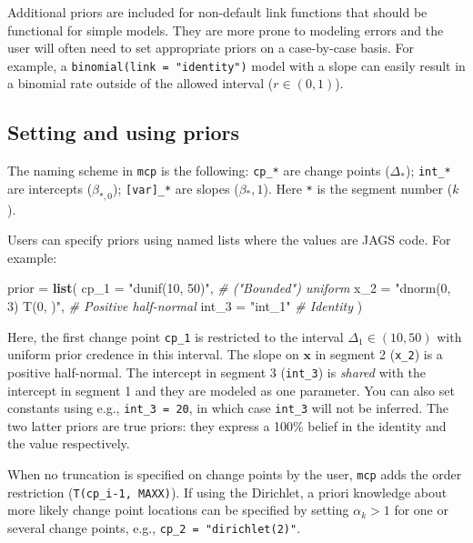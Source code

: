 \documentclass[
  american,
]{article}
\newenvironment{Shaded}{\begin{snugshade}}{\end{snugshade}}
\newcommand{\CommentTok}[1]{\textcolor[rgb]{0.56,0.35,0.01}{\textit{#1}}}
\newcommand{\DataTypeTok}[1]{\textcolor[rgb]{0.13,0.29,0.53}{#1}}
\newcommand{\KeywordTok}[1]{\textcolor[rgb]{0.13,0.29,0.53}{\textbf{#1}}}
\newcommand{\NormalTok}[1]{#1}
\newcommand{\StringTok}[1]{\textcolor[rgb]{0.31,0.60,0.02}{#1}}
\begin{document}
Additional priors are included for non-default link functions that should be functional for simple models. They are more prone to modeling errors and the user will often need to set appropriate priors on a case-by-case basis. For example, a \texttt{binomial(link\ =\ "identity")} model with a slope can easily result in a binomial rate outside of the allowed interval (\(r \in (0, 1)\)).

\hypertarget{priors_api}{%
\subsection{Setting and using priors}\label{priors_api}}

The naming scheme in \texttt{mcp} is the following: \texttt{cp\_*} are change points (\(\Delta_*\)); \texttt{int\_*} are intercepts (\(\beta_{*, 0}\)); \texttt{{[}var{]}\_*} are slopes (\(\beta{_*, 1}\)). Here \texttt{*} is the segment number (\(k\)).

Users can specify priors using named lists where the values are JAGS code. For example:

\begin{Shaded}
\begin{Highlighting}[]
\NormalTok{prior =}\StringTok{ }\KeywordTok{list}\NormalTok{(}
  \DataTypeTok{cp_1 =} \StringTok{"dunif(10, 50)"}\NormalTok{,      }\CommentTok{# ("Bounded") uniform}
  \DataTypeTok{x_2 =} \StringTok{"dnorm(0, 3) T(0, )"}\NormalTok{,  }\CommentTok{# Positive half-normal}
  \DataTypeTok{int_3 =} \StringTok{"int_1"}              \CommentTok{# Identity}
\NormalTok{)}
\end{Highlighting}
\end{Shaded}

Here, the first change point \texttt{cp\_1} is restricted to the interval \(\Delta_1 \in (10, 50)\) with uniform prior credence in this interval. The slope on \(\mathbf{x}\) in segment 2 (\texttt{x\_2}) is a positive half-normal. The intercept in segment 3 (\texttt{int\_3}) is \emph{shared} with the intercept in segment 1 and they are modeled as one parameter. You can also set constants using e.g., \texttt{int\_3\ =\ 20}, in which case \texttt{int\_3} will not be inferred. The two latter priors are true priors: they express a 100\% belief in the identity and the value respectively.

When no truncation is specified on change points by the user, \texttt{mcp} adds the order restriction (\texttt{T(cp\_i-1,\ MAXX)}). If using the Dirichlet, a priori knowledge about more likely change point locations can be specified by setting \(\alpha_k > 1\) for one or several change points, e.g., \texttt{cp\_2\ =\ "dirichlet(2)"}.
\end{document}
